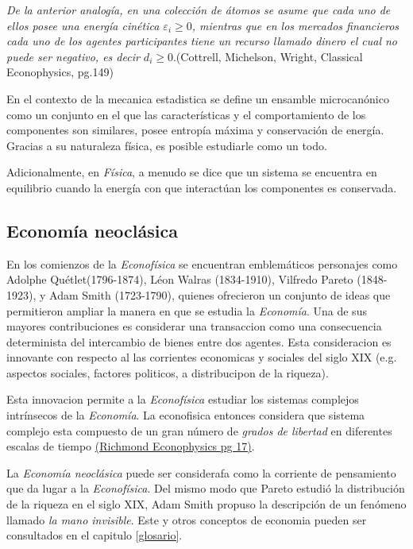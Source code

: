 \textit{De la anterior analogía, en una colección de átomos se asume que cada uno de ellos posee una energía cinética $\mathit{\varepsilon}_{i} \geqslant 0 $, mientras que en los mercados financieros cada uno de los agentes participantes tiene un recurso llamado dinero el cual no puede ser negativo, es decir  $\mathit{d}_{i} \geqslant 0 $}.(Cottrell, Michelson, Wright, Classical Econophysics, pg.149)

En el contexto de la mecanica estadistica se define un ensamble microcanónico como un conjunto  en el que las características y el comportamiento de los componentes son similares, posee entropía máxima y conservación de energía. Gracias a su naturaleza física, es posible estudiarle como un todo.  

Adicionalmente, en \textit{Física}, a menudo se dice que un sistema se encuentra en equilibrio cuando la energía con que interactúan los componentes es conservada. 


\subsection{Economía neoclásica} 

En los comienzos de la \textit{Econofísica} se encuentran emblemáticos personajes como Adolphe Quétlet(1796-1874), Léon Walras (1834-1910), Vilfredo Pareto (1848-1923), y Adam Smith (1723-1790), quienes ofrecieron un conjunto de ideas que permitieron ampliar la manera en que se estudia la \textit{Economía}.
Una de sus mayores contribuciones es considerar una transaccion como una consecuencia determinista del intercambio de bienes entre dos agentes.
Esta consideracion es innovante con respecto al las corrientes economicas y sociales del siglo XIX (e.g. aspectos sociales,  factores politicos, a distribucipon de la riqueza). 

Esta innovacion permite a la \textit{Econofísica} estudiar los sistemas complejos intrínsecos de la \textit{Economía}. La econofisica entonces considera que sistema complejo esta compuesto de un gran número de \textit{grados de libertad} en diferentes escalas de tiempo \underline{(Richmond Econophysics pg 17)}.

La \textit{Economía neoclásica} puede ser considerafa como la corriente de pensamiento que da lugar a la \textit{Econofísica}. Del mismo modo que Pareto estudió la distribución de la riqueza en el siglo XIX, Adam Smith propuso la descripción de un fenómeno llamado \textit{la mano invisible}. 
Este y otros conceptos de economia pueden ser consultados en el capitulo \ref{glosario}.




